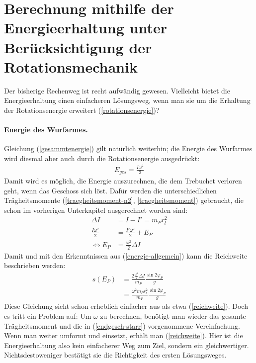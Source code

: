 \section{Berechnung mithilfe der Energieerhaltung unter Berücksichtigung der Rotationsmechanik}
\label{energie-rot}
Der bisherige Rechenweg ist recht aufwändig gewesen. Vielleicht bietet die Energieerhaltung einen einfacheren Lösungsweg, wenn man sie um die Erhaltung der Rotationsenergie erweitert (\ref{rotationsenergie})?

\paragraph{Energie des Wurfarmes.}
Gleichung (\ref{gesammtenergie}) gilt natürlich weiterhin; die Energie des Wurfarmes wird diesmal aber auch durch die Rotationsenergie ausgedrückt:
\begin{align}
E_{ges}=\frac{I\omega^2}{2}
\end{align}
Damit wird es möglich, die Energie auszurechnen, die dem Trebuchet verloren geht, wenn das Geschoss sich löst. Dafür werden die unterschiedlichen Trägheitsmomente (\ref{traegheitsmoment-n2}, \ref{traegheitsmoment}) gebraucht, die schon im vorherigen Unterkapitel ausgerechnet worden sind:
\begin{align}
\Delta I &= I-I'= m_P r_l^2\\
\frac{I\omega^2}{2}&=\frac{I'\omega^2}{2}+E_P\\
\Leftrightarrow E_P&=\frac{\omega^2}{2}\Delta I 
\end{align}
Damit und mit den Erkenntnissen aus (\ref{energie-allgemein}) kann die Reichweite beschrieben werden:
\begin{align}
\nonumber
s(E_P)&= \frac{2 \frac{\omega^2}{2}\Delta I}{ m_P}\frac{\sin{2\varphi_P}}{g}\\
	  &= \frac{\omega^2 m_P r_l^2}{ m_P}\frac{\sin{2\varphi_P}}{g}
\end{align}
Diese Gleichung sieht schon erheblich einfacher aus als etwa (\ref{reichweite}). Doch es tritt ein Problem auf: Um $\omega$ zu berechnen, benötigt man wieder das gesamte Trägheitsmoment und die in (\ref{endgesch-starr}) vorgenommene Vereinfachung. Wenn man weiter umformt und einsetzt, erhält man (\ref{reichweite}). Hier ist die Energieerhaltung also kein einfacherer Weg zum Ziel, sondern ein gleichwertiger. Nichtsdestoweniger bestätigt sie die Richtigkeit des ersten Lösungsweges.